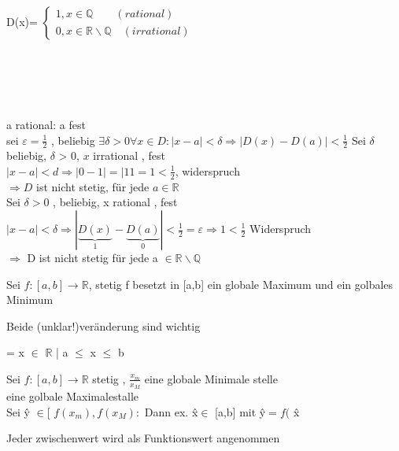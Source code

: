 \begin{example}
	D(x)=  
$	\begin{cases}
		1, x \in \mathbb{Q} \quad \quad (rational)\\		
		0, x \in \mathbb{R} \backslash \mathbb{Q} \quad (irrational) 	
	\end{cases}$\\ \\
\\
 \\ 
\\ \\ a rational: a fest 
\\ sei $\varepsilon = \frac{1}{2}$ , beliebig  $\exists \delta > 0 \forall x \in D: |x-a| < \delta \Rightarrow |D(x) -D(a) | < \frac{1}{2}$ 
Sei $\delta$ beliebig, $\delta$ > 0, $x$ irrational , fest \\
$|x-a|<d \Rightarrow |0-1| =|11= 1 < \frac{1}{2}$, widerspruch \\
$\Rightarrow D$ ist nicht stetig, für jede $ a \in \mathbb{R}$  \\
Sei $\delta >0$ , beliebig, x rational , fest $|x-a| < \delta \Rightarrow |\underbrace{D(x)}_1 -\underbrace{D(a)}_0| < \frac{1}{2}= \varepsilon \Rightarrow 1 < \frac{1}{2} $ Widerspruch \\
$\Rightarrow$ D ist nicht stetig für jede a $\in \mathbb{R} \backslash \mathbb{Q}$ 
\end{example}
\begin{theorem}
Sei $ f: [a,b] \rightarrow \mathbb{R}$, stetig 
f besetzt in [a,b] ein globale Maximum und ein golbales Minimum
\end{theorem}
\begin{remark}
Beide (unklar!)veränderung sind wichtig
\end{remark}
\begin{remark}
	[a,k]= {x $\in$ $\mathbb{R}$ | a $\leq$ x $\leq$ b}
\end{remark}
\begin{theorem}[ZWS]
	 Sei $f: [a,b] \rightarrow \mathbb{R}$ stetig , $\frac{x_m}{x_M}$ eine globale Minimale stelle \\ 
	 eine golbale Maximalestalle\\	
	 Sei  \^{y}
	 $ \in $[ $f(x_m) , f(x_M) :$ Dann ex.  \^{x}$ \in $ [a,b] mit  \^{y}$=f($ \^{x} 
\end{theorem}
\begin{remark}
	Jeder zwischenwert wird als Funktionswert angenommen
\end{remark}
